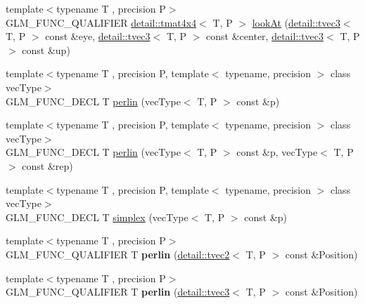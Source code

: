 \begin{DoxyCompactItemize}
\item 
{\footnotesize template$<$typename T , precision P$>$ }\\G\+L\+M\+\_\+\+F\+U\+N\+C\+\_\+\+Q\+U\+A\+L\+I\+F\+I\+ER \hyperlink{structglm_1_1detail_1_1tmat4x4}{detail\+::tmat4x4}$<$ T, P $>$ \hyperlink{group__gtc__matrix__transform_ga454fdf3163c2779eeeeeb9d75907ce97}{look\+At} (\hyperlink{structglm_1_1detail_1_1tvec3}{detail\+::tvec3}$<$ T, P $>$ const \&eye, \hyperlink{structglm_1_1detail_1_1tvec3}{detail\+::tvec3}$<$ T, P $>$ const \&center, \hyperlink{structglm_1_1detail_1_1tvec3}{detail\+::tvec3}$<$ T, P $>$ const \&up)
\item 
{\footnotesize template$<$typename T , precision P, template$<$ typename, precision $>$ class vec\+Type$>$ }\\G\+L\+M\+\_\+\+F\+U\+N\+C\+\_\+\+D\+E\+CL T \hyperlink{group__gtc__noise_ga14e5975486b2b36e747861d3c65b16c1}{perlin} (vec\+Type$<$ T, P $>$ const \&p)
\item 
{\footnotesize template$<$typename T , precision P, template$<$ typename, precision $>$ class vec\+Type$>$ }\\G\+L\+M\+\_\+\+F\+U\+N\+C\+\_\+\+D\+E\+CL T \hyperlink{group__gtc__noise_ga7e103ffffacb322fe2d4863c372ae2fd}{perlin} (vec\+Type$<$ T, P $>$ const \&p, vec\+Type$<$ T, P $>$ const \&rep)
\item 
{\footnotesize template$<$typename T , precision P, template$<$ typename, precision $>$ class vec\+Type$>$ }\\G\+L\+M\+\_\+\+F\+U\+N\+C\+\_\+\+D\+E\+CL T \hyperlink{group__gtc__noise_ga05f5ab240c9a3fdeee353636e464c285}{simplex} (vec\+Type$<$ T, P $>$ const \&p)
\item 
{\footnotesize template$<$typename T , precision P$>$ }\\G\+L\+M\+\_\+\+F\+U\+N\+C\+\_\+\+Q\+U\+A\+L\+I\+F\+I\+ER T {\bfseries perlin} (\hyperlink{structglm_1_1detail_1_1tvec2}{detail\+::tvec2}$<$ T, P $>$ const \&Position)\hypertarget{namespaceglm_aaf4944b3c2a00c1e7a1b25b96cea6bfb}{}\label{namespaceglm_aaf4944b3c2a00c1e7a1b25b96cea6bfb}

\item 
{\footnotesize template$<$typename T , precision P$>$ }\\G\+L\+M\+\_\+\+F\+U\+N\+C\+\_\+\+Q\+U\+A\+L\+I\+F\+I\+ER T {\bfseries perlin} (\hyperlink{structglm_1_1detail_1_1tvec3}{detail\+::tvec3}$<$ T, P $>$ const \&Position)\hypertarget{namespaceglm_a11707c4e77f153abec905731b1ce52a0}{}\label{namespaceglm_a11707c4e77f153abec905731b1ce52a0}


\end{DoxyCompactItemize}
